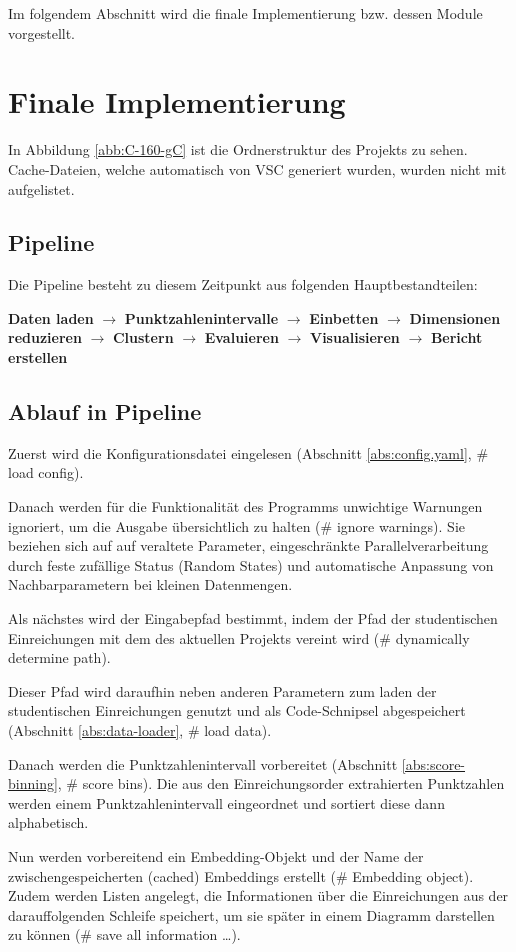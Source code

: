 Im folgendem Abschnitt wird die finale Implementierung bzw. dessen Module vorgestellt.

\section{Finale Implementierung}
In Abbildung \ref{abb:C-160-gC} ist die Ordnerstruktur des Projekts zu sehen. Cache-Dateien, welche automatisch von VSC generiert wurden, wurden nicht mit aufgelistet.
\subsection{Pipeline}
Die Pipeline besteht zu diesem Zeitpunkt aus folgenden Hauptbestandteilen:

\textbf{Daten laden} $\rightarrow$ \textbf{Punktzahlenintervalle} $\rightarrow$ \textbf{Einbetten} $\rightarrow$ \textbf{Dimensionen reduzieren} $\rightarrow$ \textbf{Clustern} $\rightarrow$ \textbf{Evaluieren} $\rightarrow$ \textbf{Visualisieren} $\rightarrow$ \textbf{Bericht erstellen}

\subsection{Ablauf in Pipeline}
Zuerst wird die Konfigurationsdatei eingelesen (Abschnitt \ref{abs:config.yaml}, \# load config).

Danach werden für die Funktionalität des Programms unwichtige Warnungen ignoriert, um die Ausgabe übersichtlich zu halten (\# ignore warnings). Sie beziehen sich auf auf veraltete Parameter, eingeschränkte Parallelverarbeitung durch feste zufällige Status (Random States) und automatische Anpassung von Nachbarparametern bei kleinen Datenmengen.

Als nächstes wird der Eingabepfad bestimmt, indem der Pfad der studentischen Einreichungen mit dem des aktuellen Projekts vereint wird (\# dynamically determine path).

Dieser Pfad wird daraufhin neben anderen Parametern zum laden der studentischen Einreichungen genutzt und als Code-Schnipsel abgespeichert (Abschnitt \ref{abs:data-loader}, \# load data).

Danach werden die Punktzahlenintervall vorbereitet (Abschnitt \ref{abs:score-binning}, \# score bins). Die aus den Einreichungsorder extrahierten Punktzahlen werden einem Punktzahlenintervall eingeordnet und sortiert diese dann alphabetisch.

Nun werden vorbereitend ein Embedding-Objekt und der Name der zwischengespeicherten (cached) Embeddings erstellt (\# Embedding object). Zudem werden Listen angelegt, die Informationen über die Einreichungen aus der darauffolgenden Schleife speichert, um sie später in einem Diagramm darstellen zu können (\# save all information \dots).

